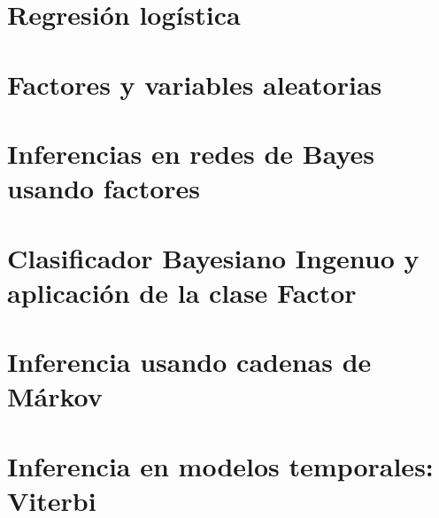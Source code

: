 \documentclass[12pt,openany]{book}
\begin{document}





\chapter{Regresión logística}






\chapter{Factores y variables aleatorias}





\chapter[Inferencia]{Inferencias en redes de Bayes usando factores}





\chapter[Bayes Ingenuo]{Clasificador Bayesiano Ingenuo y aplicación de la clase Factor}





\chapter{Inferencia usando cadenas de Márkov}





\chapter{Inferencia en modelos temporales: Viterbi}
\end{document}
